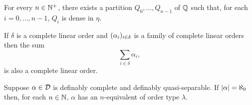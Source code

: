 \begin{prp}\label{prp:qdense}
	For every $n\in\mathbb{N}^{+}$, there exists a partition $Q_0,\dotsc,Q_{n-1}$ of $\mathbb{Q}$ such that, for each $i=0,\dotsc,n-1$, $Q_i$ is dense in $\eta$.
\end{prp}

\begin{prp}\label{prp:csums}
	If $\delta$ is a complete linear order and $(\alpha_i)_{i\in\delta}$ is a family of complete linear orders then the sum
	\begin{equation}
		\sum_{i\in\delta}\alpha_i,
	\end{equation}
	is also a complete linear order.
\end{prp}

\begin{thm}
	Suppose $\alpha\in\mathcal{D}$ is definably complete and definably quasi-separable. If $\left\lvert\alpha\right\rvert=\aleph_0$ then, for each $n\in\mathbb{N}$, $\alpha$ has an $n$-equivalent of order type $\lambda$.
\end{thm}
